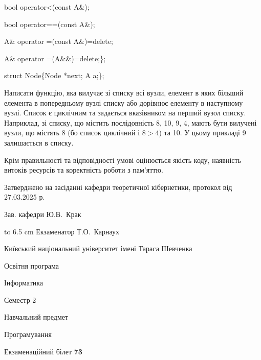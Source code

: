 \documentclass[12pt, ukrainian]{article}
\begin{document}
{\quad  bool operator<(const A\&); 

\quad  bool operator==(const A\&); 

\quad A\& operator =(const A\&)=delete; 

\quad  A\& operator =(A\&\&)=delete;\};

struct Node\{Node *next; A a;\};

 Написати функцію, яка вилучає зі списку всі вузли, елемент в яких більший елемента в попередньому вузлі списку або дорівнює елементу в наступному вузлі. Список є циклічним та задається вказівником на перший вузол списку. Наприклад, зі списку, що містить послідовність 8, 10, 9, 4, мають бути вилучені вузли, що містять 8 (бо список циклічний і $8>4$) та 10. У цьому прикладі 9 залишається в списку.

Крім правильності та відповідності умові оцінюється якість коду, наявність витоків ресурсів та коректність роботи з пам'яттю. 

}
{\smallskip\smallskip \begin {scriptsize} Затверджено на засіданні кафедри теоретичної кібернетики, протокол   від   27.03.2025 р.\par\smallskip\smallskip\smallskip\smallskip
{\parbox {6.5 cm} {Зав. кафедри \dotfill Ю.В.~Крак}}\hspace {0.7cm} {\hbox to 6.5 cm { Екзаменатор \dotfill Т.О.~Карнаух}} \end{scriptsize}}
\newpage
{{\begin {scriptsize}\par
{ \center  Київський національний університет імені Тараса Шевченка \par}
{\parbox {5 cm}{Освітня програма \hfill}{\parbox {7 cm}{Інформатика\hfill}}\parbox {6 cm}{\hfill Семестр 2}}\par
{\parbox {5 cm} {Навчальний предмет \hfill}\parbox {7 cm}{Програмування \hfill}\parbox {6cm}{\hfill}\par}\vspace{-15pt} \end{scriptsize}}{\center Екзаменаційний білет \No \textbf { 73 }\par}}
\end{document}
